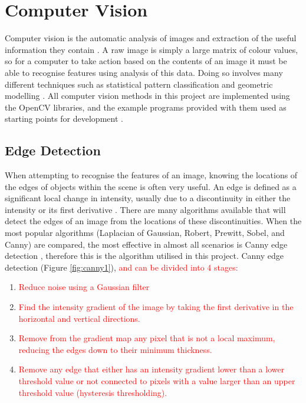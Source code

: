 \section{Computer Vision}

Computer vision is the automatic analysis of images and extraction of the useful information they contain \cite{CVDef}. A raw image is simply a large matrix of colour values, so for a computer to take action based on the contents of an image it must be able to recognise features using analysis of this data. Doing so involves many different techniques such as statistical pattern classification and geometric modelling \cite{ballard1982computer}. All computer vision methods in this project are implemented using the OpenCV libraries, and the example programs provided with them used as starting points for development \cite{OpenCV}.

\subsection{Edge Detection}
When attempting to recognise the features of an image, knowing the locations of the edges of objects within the scene is often very useful. An edge is defined as a significant local change in intensity, usually due to a discontinuity in either the intensity or its first derivative \cite{jain1995machine}. There are many algorithms available that will detect the edges of an image from the locations of these discontinuities. When the most popular algorithms (Laplacian of Gaussian, Robert, Prewitt, Sobel, and Canny) are compared, the most effective in almost all scenarios is Canny edge detection \cite{maini2009study}, therefore this is the algorithm utilised in this project. Canny edge detection \cite{canny1986computational} (Figure \ref{fig:canny1}), \textcolor{red}{and can be divided into 4 stages:}
\begin{enumerate}
    \item \textcolor{red}{Reduce noise using a Gaussian filter}
    \item \textcolor{red}{Find the intensity gradient of the image by taking the first derivative in the horizontal and vertical directions.}
    \item \textcolor{red}{Remove from the gradient map any pixel that is not a local maximum, reducing the edges down to their minimum thickness.}
    \item \textcolor{red}{Remove any edge that either has an intensity gradient lower than a lower threshold value or not connected to pixels with a value larger than an upper threshold value (hysteresis thresholding).}
\end{enumerate}

